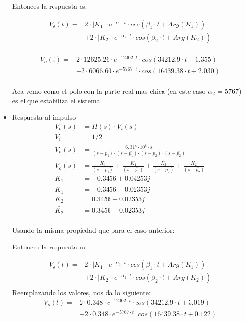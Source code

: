 \documentclass[11pt]{diazessay} %
\begin{document}
\begin{itemize}
Entonces la respuesta es:

\begin{align*}
V_{o}(t) = &2 \cdot |K_{1}| \cdot e^{- \alpha_{1} \cdot t} \cdot cos(\beta_{1} \cdot t + Arg(K_{1})) \\
&+  2 \cdot |K_{2}| \cdot e^{- \alpha_{2} \cdot t} \cdot cos(\beta_{2} \cdot t + Arg(K_{2}))\\[10pt]
\end{align*}

\begin{align*}
V_{o}(t) = &2 \cdot 12625.26 \cdot e^{-12002 \cdot t} \cdot cos(34212.9 \cdot t - 1.355) \\
&+  2 \cdot 6066.60 \cdot e^{-5767 \cdot t} \cdot cos(16439.38 \cdot t + 2.030)\\[10pt]
\end{align*}

Aca vemo como el polo con la parte real mas chica (en este caso $\alpha_{2}$ = 5767) es el que estabiliza el sistema.

\newpage
\item Respuesta al impulso
\begin{align*}
V_{o}(s) &= H(s) \cdot V_{i}(s)\\[10pt]
V_{i} &= 1/2 \\[10pt]
V_{o}(s) &= \frac{6,317 \cdot 10^8 \cdot s}{(s - p_{1}) \cdot (s - \bar{p_{1}}) \cdot (s - p_{2}) \cdot (s - \bar{p_{2}})} \\[10pt]
V_{o}(s) &= \frac{K_{1}}{(s - p_{1})} + \frac{\bar{K_{1}}}{(s - \bar{p_{1}})} +  \frac{K_{2}}{(s - p_{2})} + \frac{\bar{K_{2}}}{(s - \bar{p_{2}})} \\[10pt]
K_{1} &= -0.3456 + 0.04253j \\[10pt]
\bar{K_{1}} &= -0.3456 - 0.02353j \\[10pt]
K_{2} &= 0.3456 + 0.02353j  \\[10pt]
\bar{K_{2}} &= 0.3456 - 0.02353j  \\[10pt]
\end{align*}

Usando la misma propiedad que para el caso anterior:

Entonces la respuesta es:

\begin{align*}
V_{o}(t) = &2 \cdot |K_{1}| \cdot e^{- \alpha_{1} \cdot t} \cdot cos(\beta_{1} \cdot t + Arg(K_{1})) \\
&+  2 \cdot |K_{2}| \cdot e^{- \alpha_{2} \cdot t} \cdot cos(\beta_{2} \cdot t + Arg(K_{2}))\\
\end{align*}
Reemplazando los valores, nos da lo siguiente:
\begin{align*}
V_{o}(t) = &2 \cdot 0.348 \cdot e^{-12002 \cdot t} \cdot cos(34212.9 \cdot t + 3.019) \\
&+  2 \cdot 0.348 \cdot e^{-5767 \cdot t} \cdot cos(16439.38 \cdot t + 0.122)\\[10pt]
\end{align*}


\end{itemize}
\end{document}
